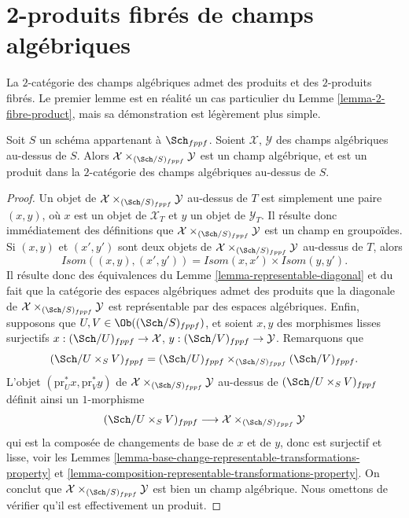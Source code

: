 \section{2-produits fibrés de champs algébriques}
\label{section-2-fibre-products}

\noindent
La $2$-catégorie des champs algébriques admet des produits et des $2$-produits fibrés.
Le premier lemme est en réalité un cas particulier du
Lemme \ref{lemma-2-fibre-product},
mais sa démonstration est légèrement plus simple.

\begin{lemma}
\label{lemma-product-spaces}
Soit $S$ un schéma appartenant à $\Sch_{fppf}$.
Soient $\mathcal{X}$, $\mathcal{Y}$ des champs algébriques au-dessus de $S$.
Alors $\mathcal{X} \times_{(\Sch/S)_{fppf}} \mathcal{Y}$
est un champ algébrique, et est un produit dans la $2$-catégorie des
champs algébriques au-dessus de $S$.
\end{lemma}

\begin{proof}
Un objet de $\mathcal{X} \times_{(\Sch/S)_{fppf}} \mathcal{Y}$
au-dessus de $T$ est simplement une paire $(x, y)$, où $x$ est un objet de $\mathcal{X}_T$
et $y$ un objet de $\mathcal{Y}_T$. Il résulte donc immédiatement
des définitions que
$\mathcal{X} \times_{(\Sch/S)_{fppf}} \mathcal{Y}$ est un
champ en groupoïdes. Si $(x, y)$ et $(x', y')$ sont
deux objets de $\mathcal{X} \times_{(\Sch/S)_{fppf}} \mathcal{Y}$
au-dessus de $T$, alors
$$
\mathit{Isom}((x, y), (x', y')) =
\mathit{Isom}(x, x') \times \mathit{Isom}(y, y').
$$
Il résulte donc des équivalences du
Lemme \ref{lemma-representable-diagonal}
et du fait que la catégorie des espaces algébriques admet des produits
que la diagonale de $\mathcal{X} \times_{(\Sch/S)_{fppf}} \mathcal{Y}$
est représentable par des espaces algébriques.
Enfin, supposons que $U, V \in \Ob((\Sch/S)_{fppf})$,
et soient $x, y$ des morphismes lisses surjectifs
$x : (\Sch/U)_{fppf} \to \mathcal{X}$,
$y : (\Sch/V)_{fppf} \to \mathcal{Y}$.
Remarquons que
$$
(\Sch/U \times_S V)_{fppf} =
(\Sch/U)_{fppf}
\times_{(\Sch/S)_{fppf}} (\Sch/V)_{fppf}.
$$
L'objet $(\text{pr}_U^*x, \text{pr}_V^*y)$ de
$\mathcal{X} \times_{(\Sch/S)_{fppf}} \mathcal{Y}$ au-dessus de
$(\Sch/U \times_S V)_{fppf}$ définit ainsi un $1$-morphisme
$$
(\Sch/U \times_S V)_{fppf}
\longrightarrow
\mathcal{X} \times_{(\Sch/S)_{fppf}} \mathcal{Y}
$$
qui est la composée de changements de base de $x$ et de $y$, donc
est surjectif et lisse, voir les
Lemmes \ref{lemma-base-change-representable-transformations-property} et
\ref{lemma-composition-representable-transformations-property}.
On conclut que $\mathcal{X} \times_{(\Sch/S)_{fppf}} \mathcal{Y}$
est bien un champ algébrique. Nous omettons de vérifier qu'il
est effectivement un produit.
\end{proof}

